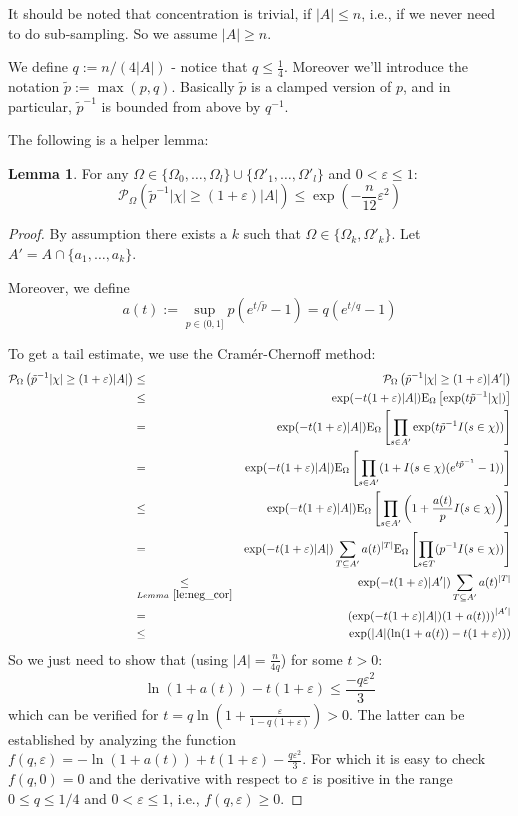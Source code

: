 \documentclass{article}
\newcommand{\prob}{\mathcal P}
\newcommand{\expectation}{\mathrm{E}}
\newcommand{\eps}{\varepsilon}
\theoremstyle{definition}
\newtheorem{lemma}{Lemma}
\begin{document}
It should be noted that concentration is trivial, if $|A| \leq n$, i.e., if we never need to do sub-sampling.
So we assume $|A| \geq n$. 

We define $q := n/(4|A|)$ - notice that $q \leq \frac{1}{4}$. Moreover we'll introduce the notation $\tilde{p} := \max(p,q)$.
Basically $\tilde{p}$ is a clamped version of $p$, and in particular, $\tilde{p}^{-1}$ is bounded from above by $q^{-1}$.

The following is a helper lemma:
\begin{lemma}
\label{le:helper}
For any $\Omega \in \{\Omega_0,\ldots,\Omega_l\} \cup \{\Omega'_1,\ldots,\Omega'_l\}$ and $0 < \eps \leq 1$:
\[
\prob_{\Omega} \left( \tilde{p}^{-1} |\chi| \geq (1+\eps) |A| \right) \leq \exp\left(-\frac{n}{12} \eps^2\right)
\]
\end{lemma}
\begin{proof}
By assumption there exists a $k$ such that $\Omega \in \{\Omega_k, \Omega'_k\}$. Let $A' = A \cap \{a_1,\ldots,a_k\}$.

Moreover, we define 
\[
  a(t) := \sup_{p \in (0,1]} p (e^{t/ \tilde{p}}-1) = q (e^{t/q}-1)
\]

To get a tail estimate, we use the Cram\'{e}r-Chernoff method: 
{\allowdisplaybreaks
\begin{eqnarray*}
  \prob_{\Omega} \left( \tilde{p}^{-1} |\chi| \geq (1+\eps) |A| \right) & \leq & \prob_{\Omega} \left( \tilde{p}^{-1} |\chi| \geq (1+\eps) |A'| \right) \\
  & \leq & \exp( -t (1+\eps) |A| ) \expectation_\Omega \left[ \exp ( t \tilde{p}^{-1} |\chi| ) \right] \\
 & = & \exp( -t (1+\eps) |A| ) \expectation_\Omega \left[ \prod_{s \in A'} \exp ( t \tilde{p}^{-1} I(s \in \chi) ) \right] \\  
  & = & \exp( -t (1+\eps) |A| ) \expectation_\Omega \left[ \prod_{s \in A'} (1 + I(s \in \chi) (e^{t \tilde{p}^{-1}}-1) ) \right] \\  
 & \leq & \exp( -t (1+\eps) |A| ) \expectation_\Omega \left[ \prod_{s \in A'} \left(1 + \frac{a(t)}{p} I(s \in \chi) \right) \right] \\  
 & = & \exp( -t (1+\eps) |A| ) \sum_{T \subseteq A'} a(t)^{|T|} \expectation_\Omega \left[ \prod_{s \in T} (p^{-1} I(s \in \chi) ) \right] \\  
 & \underset{Lemma~\ref{le:neg_cor}}{\leq} & \exp( -t (1+\eps) |A'| ) \sum_{T \subseteq A'} a(t)^{|T|} \\  
 & = & \left(\exp( -t (1+\eps) |A| ) (1+a(t))\right)^{|A'|} \\ & \leq & \exp ( |A| (\ln(1+a(t))-t (1+\eps)))
\end{eqnarray*}}
So we just need to show that (using $|A|=\frac{n}{4q}$) for some $t > 0$:
\[
  \ln(1+a(t))-t (1+\eps) \leq \frac{-q \eps^2}{3}
\]
which can be verified for $t = q \ln ( 1 + \frac{\eps}{1-q(1+\eps)}) > 0$.
The latter can be established by analyzing the function $f(q,\eps) = -\ln (1+a(t)) +t (1+\eps) - \frac{q\eps^2}{3}$.
For which it is easy to check $f(q,0) = 0$ and the derivative with respect to $\eps$ is positive in the range $0 \leq q \leq 1/4$ and $0 < \eps \leq 1$, i.e.,
$f(q,\eps) \geq 0$.
\end{proof}
\end{document}
